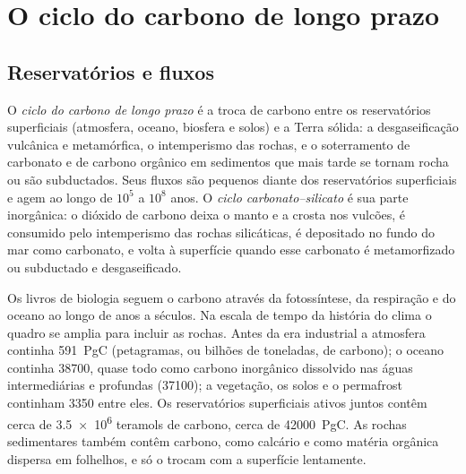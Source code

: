 \section{O ciclo do carbono de longo prazo}\label{sec:b2:deep-time-climate:cycle}

\subsection*{Reservatórios e fluxos}

\begin{definition}\label{def:b2:deep-time-climate:carbon-cycle}
O \emph{ciclo do carbono de longo prazo} é a troca de carbono entre
os reservatórios superficiais (atmosfera, oceano, biosfera e solos) e a Terra sólida: a desgaseificação vulcânica e
metamórfica, o intemperismo das rochas, e o soterramento de carbonato e de carbono orgânico em
sedimentos que mais tarde se tornam rocha ou são subductados. Seus fluxos são pequenos diante dos reservatórios
superficiais e agem ao longo de $10^5$ a $10^8$ anos. O \emph{ciclo
carbonato--silicato} é sua parte inorgânica: o dióxido de carbono deixa o manto
e a crosta nos vulcões, é consumido pelo intemperismo das rochas silicáticas, é depositado no
fundo do mar como carbonato, e volta à superfície quando esse carbonato é metamorfizado ou
subductado e desgaseificado.
\end{definition}

Os livros de biologia seguem o carbono através da fotossíntese, da respiração e do oceano ao longo de anos a
séculos. Na escala de tempo da história do clima o quadro se amplia para incluir as rochas. Antes da
era industrial a atmosfera continha \qty{591}{PgC} (petagramas, ou bilhões de toneladas, de carbono);
o oceano continha \num{38700}, quase todo como carbono inorgânico dissolvido nas águas intermediárias e
profundas (\num{37100}); a vegetação, os solos e o permafrost continham \num{3350} entre eles. Os
reservatórios superficiais ativos juntos contêm cerca de \num{3.5e6} teramols de carbono, cerca de
\qty{42000}{PgC}. As rochas sedimentares também contêm carbono, como calcário e como matéria orgânica
dispersa em folhelhos, e só o trocam com a superfície lentamente.

